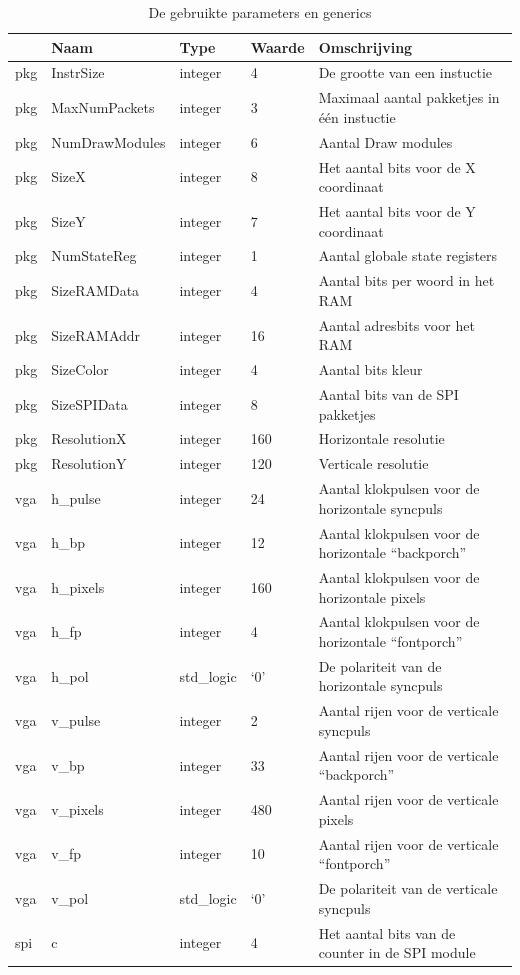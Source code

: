 \documentclass{scrreprt} %
\begin{document}
\begin{table}[H]
\centering
\caption{De gebruikte parameters en generics}
\label{tab:spec-params}
\begin{tabular}{l l l l l}
	\hline\hline
 	 & Naam & Type & Waarde & Omschrijving\\
 	\hline
	pkg & InstrSize & integer & 4 & De grootte van een instuctie\\ 
	pkg & MaxNumPackets & integer & 3 & Maximaal aantal pakketjes in één instuctie\\ 
	pkg & NumDrawModules & integer & 6 & Aantal Draw modules\\ 
	pkg & SizeX & integer & 8 & Het aantal bits voor de X coordinaat\\
	pkg & SizeY & integer & 7 & Het aantal bits voor de Y coordinaat\\
	pkg & NumStateReg & integer & 1 & Aantal globale state registers\\
	pkg & SizeRAMData & integer & 4 & Aantal bits per woord in het RAM\\
	pkg & SizeRAMAddr & integer & 16 & Aantal adresbits voor het RAM\\
	pkg & SizeColor & integer & 4 & Aantal bits kleur\\
	pkg & SizeSPIData & integer & 8 & Aantal bits van de SPI pakketjes\\
	pkg & ResolutionX & integer & 160 & Horizontale resolutie \\
	pkg & ResolutionY & integer & 120 & Verticale resolutie \\
	vga & h\_pulse & integer & 24 & Aantal klokpulsen voor de horizontale syncpuls\\ 
	vga & h\_bp & integer & 12 & Aantal klokpulsen voor de horizontale “backporch” \\ 
	vga & h\_pixels & integer & 160 & Aantal klokpulsen voor de horizontale pixels \\ 
	vga & h\_fp & integer & 4 & Aantal klokpulsen voor de horizontale “fontporch” \\ 
	vga & h\_pol & std\_logic & ‘0’ & De polariteit van de horizontale syncpuls\\ 
	vga & v\_pulse & integer & 2 & Aantal rijen voor de verticale syncpuls\\ 
	vga & v\_bp & integer & 33 & Aantal rijen voor de verticale “backporch” \\ 
	vga & v\_pixels & integer & 480 & Aantal rijen voor de verticale pixels\\ 
	vga & v\_fp & integer & 10 & Aantal rijen voor de verticale “fontporch” \\ 
	vga & v\_pol & std\_logic & ‘0’ & De polariteit van de verticale syncpuls\\ 
	spi & c & integer & 4 & Het aantal bits van de counter in de SPI module\\
  	\hline
\end{tabular}
\end{table}
\end{document}

